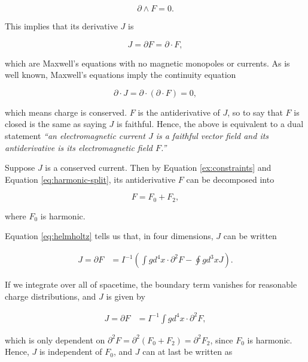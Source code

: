 \documentclass{article}
\begin{document}
\begin{equation}
  \partial \wedge F = 0.
\end{equation}

This implies that its derivative $J$ is

\begin{equation}
  J = \partial F = \partial \cdot F,
\end{equation} 

which are Maxwell's equations with no magnetic monopoles or currents. As is well known, Maxwell's equations imply the continuity equation

\begin{equation}
  \partial \cdot J = \partial \cdot (\partial \cdot F) = 0, \label{eq:continuity}
\end{equation} 

which means charge is conserved. $F$ is the antiderivative of $J$, so to say that $F$ is closed is the same as saying $J$ is faithful. Hence, the above is equivalent to a dual statement \emph{``an electromagnetic current $J$ is a faithful vector field and its antiderivative is its electromagnetic field $F$.''}

Suppose $J$ is a conserved current. Then by Equation \ref{ex:constraints} and Equation \ref{eq:harmonic-split}, its antiderivative $F$ can be decomposed into 

\begin{equation}
  F = F_0 + F_2,
\end{equation}

where $F_0$ is harmonic. 

Equation \ref{eq:helmholtz} tells us that, in four dimensions, $J$ can be written

\begin{align}
  J = \partial F &= I^{-1} \left(\int g d^{4}x \cdot \partial^2 F - \oint g d^{3}x J \right).
\end{align}

If we integrate over all of spacetime, the boundary term vanishes for reasonable charge distributions, and $J$ is given by

\begin{align}
  J = \partial F &= I^{-1} \int g d^{4}x \cdot \partial^2 F,
\end{align}

which is only dependent on $\partial^2 F = \partial^2 (F_0 + F_2) = \partial^2 F_2$, since $F_0$ is harmonic. Hence, $J$ is independent of $F_0$, and $J$ can at last be written as 
\end{document}
